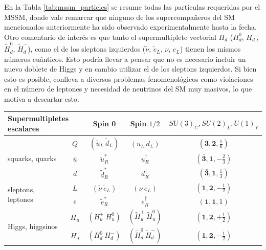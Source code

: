 En la Tabla \ref{tab:mssm_particles} se resume todas las partículas requeridas por el MSSM, donde vale remarcar que ninguno de los supercompañeros del SM mencionados anteriormente ha sido observado experimentalmente hasta la fecha. Otro comentario de interés es que tanto el supermultiplete vectorial $H_d$ ($H_d^0$, $H_d^-$, $\widetilde{H}_d^0$, $\widetilde{H}_d^-$), como el de los sleptons izquierdos ($\tilde{\nu}$, $\tilde{e}_L$, $\nu$, $e_L$) tienen los mismos números cuánticos. Esto podría llevar a pensar que no es necesario incluir un nuevo doblete de Higgs y en cambio utilizar el de los sleptons izquierdos. Si bien esto es posible, conlleva a diversos problemas fenomenológicos como violaciones en el número de leptones y necesidad de neutrinos del SM muy masivos, lo que motiva a descartar esto.


\begin{table} 

	\centering

	\begin{tabular}{ l c | c c c}

		\multicolumn{2}{l|}{Supermultipletes escalares} & Spin 0 & Spin $1/2$ & $SU(3)_C, SU(2)_L, U(1)_Y$ \\

		\hline

		\multirow{3}{*}{squarks, quarks} & $Q$ & $(\tilde{u}_L\ \tilde{d}_L)$ & $(u_L\ d_L)$ & $(\textbf{3}, \textbf{2}, \frac{1}{6})$ \\
		 & $\bar{u}$ & $\tilde{u}_R^*$ & $u_R^{\dagger}$ & $(\bar{\textbf{3}}, \textbf{1}, -\frac{2}{3})$ \\
		 & $\bar{d}$ & $\tilde{d}_R^*$ & $d_R^{\dagger}$ & $(\bar{\textbf{3}}, \textbf{1}, \frac{1}{3})$ \\

		\hline

		\multirow{2}{*}{sleptons, leptones} & $L$ & $(\tilde{\nu}\ \tilde{e}_L)$ & $(\nu\ e_L)$ & $(\textbf{1}, \textbf{2}, -\frac{1}{2})$ \\
		 & $\bar{e}$ & $\tilde{e}_R^*$ & $e_R^{\dagger}$ & $(\textbf{1}, \textbf{1}, 1)$ \\

		\hline

		\multirow{2}{*}{Higgs, higgsinos} & $H_u$ & $(H_u^+\ H_u^0)$ & $(\widetilde{H}_u^+\ \widetilde{H}_u^0)$ & $(\textbf{1}, \textbf{2}, +\frac{1}{2})$ \\
		 & $H_d$ & $(H_d^0\ H_d^-)$ & $(\widetilde{H}_d^0\ \widetilde{H}_d^-)$ & $(\textbf{1}, \textbf{2}, -\frac{1}{2})$ \\


\end{tabular}
\end{table}
